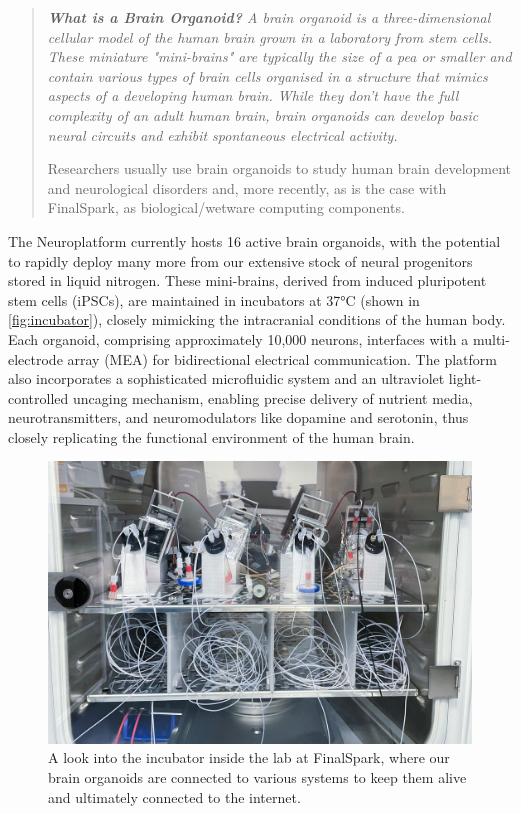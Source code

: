 \documentclass[10pt]{article}
\begin{document}
\begin{sloppypar}
  \begin{quote}
    \itshape
    \textbf{What is a Brain Organoid?}
    A brain organoid is a three-dimensional cellular model of the human brain grown in a laboratory from stem cells. These miniature "mini-brains" are typically the size of a pea or smaller and contain various types of brain cells organised in a structure that mimics aspects of a developing human brain. While they don't have the full complexity of an adult human brain, brain organoids can develop basic neural circuits and exhibit spontaneous electrical activity.

    Researchers usually use brain organoids to study human brain development and neurological disorders and, more recently, as is the case with FinalSpark, as biological/wetware computing components.
  \end{quote}

  The Neuroplatform currently hosts 16 active brain organoids, with the potential to rapidly deploy many more from our extensive stock of neural progenitors stored in liquid nitrogen. These mini-brains, derived from induced pluripotent stem cells (iPSCs), are maintained in incubators at 37°C (shown in \autoref{fig:incubator}), closely mimicking the intracranial conditions of the human body. Each organoid, comprising approximately 10,000 neurons, interfaces with a multi-electrode array (MEA) for bidirectional electrical communication. The platform also incorporates a sophisticated microfluidic system and an ultraviolet light-controlled uncaging mechanism, enabling precise delivery of nutrient media, neurotransmitters, and neuromodulators like dopamine and serotonin, thus closely replicating the functional environment of the human brain.

  \begin{figure}
    \centering
    \includegraphics[width=1\textwidth]{figures/incubator.jpg}
    \caption[Brain organoid incubator at FinalSpark lab]{A look into the incubator inside the lab at FinalSpark, where our brain organoids are connected to various systems to keep them alive and ultimately connected to the internet.}
    \label{fig:incubator}
  \end{figure}


  \pagebreak
  
  
  \nocite{*}

\end{sloppypar}
\end{document}
